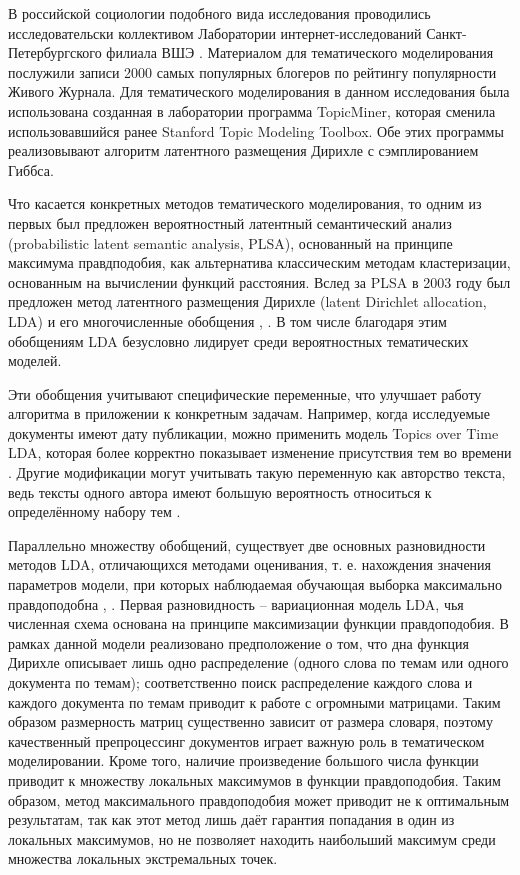 В российской социологии подобного вида исследования проводились исследовательски коллективом Лаборатории интернет-исследований Санкт-Петербургского филиала ВШЭ \cite{kolcovalda}. Материалом для тематического моделирования послужили записи 2000 самых популярных блогеров по рейтингу популярности Живого Журнала. Для тематического моделирования в данном исследования была использована созданная в лаборатории программа TopicMiner, которая сменила использовавшийся ранее Stanford Topic Modeling Toolbox. Обе этих программы реализовывают алгоритм латентного размещения Дирихле с сэмплированием Гиббса.

Что касается конкретных методов тематического моделирования, то одним из первых был предложен вероятностный латентный семантический анализ (probabilistic latent semantic analysis, PLSA), основанный на принципе максимума правдподобия, как альтернатива классическим методам кластеризации, основанным на вычислении функций расстояния. Вслед за PLSA в 2003 году был предложен метод латентного размещения Дирихле (latent Dirichlet allocation, LDA) \cite{LDAOrigin} и его многочисленные обобщения \cite{NeedlesInAHaystack}, \cite{LDASurvey}. В том числе благодаря этим обобщениям LDA безусловно лидирует среди вероятностных тематических моделей.

Эти обобщения учитывают специфические переменные, что улучшает работу алгоритма в приложении к конкретным задачам. Например, когда исследуемые документы имеют дату публикации, можно применить модель Topics over Time LDA, которая более корректно показывает изменение присутствия тем во времени \cite{ToTLDA}. Другие модификации могут учитывать такую переменную как авторство текста, ведь тексты одного автора имеют большую вероятность относиться к определённому набору тем \cite{authorLDA}.

Параллельно множеству обобщений, существует две основных разновидности методов LDA, отличающихся методами оценивания, т. е. нахождения значения параметров модели, при которых наблюдаемая обучающая выборка максимально правдоподобна \cite{kolcovaJJ}, \cite[стр. 1]{HoffmanBB10}. Первая разновидность -- вариационная модель LDA, чья численная схема основана на принципе максимизации функции правдоподобия. В рамках данной модели реализовано предположение о том, что дна функция Дирихле описывает лишь одно распределение (одного слова по темам или одного документа по темам); соответственно поиск распределение каждого слова и каждого документа по темам приводит к работе с огромными матрицами. Таким образом размерность матриц существенно зависит от размера словаря, поэтому качественный препроцессинг документов играет важную роль в тематическом моделировании. Кроме того, наличие произведение большого числа функции приводит к множеству локальных максимумов в функции правдоподобия. Таким образом, метод максимального правдоподобия может приводит не к оптимальным результатам, так как этот метод лишь даёт гарантия попадания в один из локальных максимумов, но не позволяет находить наибольший максимум среди множества локальных экстремальных точек.

